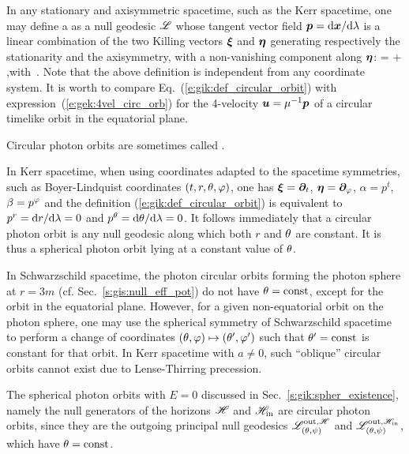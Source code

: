 In any stationary and axisymmetric spacetime, such as the Kerr spacetime, one may
define a 
as a null geodesic $\mathscr{L}$ whose tangent vector field $\bm{p}=\mathrm{d}\bm{x}/\mathrm{d}\lambda$ is a linear combination
of the two Killing vectors $\bm{\xi}$ and $\bm{\eta}$ generating respectively
the stationarity and the axisymmetry, with a non-vanishing component along $\bm{\eta}$:
\be \label{e:gik:def_circular_orbit}
     = \alpha \w{\xi} + \beta \w{\eta} ,\quad\mbox{with}\ \beta {}.
\ee
Note that the above definition is independent from any coordinate system.
It is worth to compare Eq.~(\ref{e:gik:def_circular_orbit}) with expression~(\ref{e:gek:4vel_circ_orb}) for the 4-velocity $\bm{u} = \mu^{-1}\bm{p}$ of a circular timelike orbit in the equatorial plane.

\begin{remark}
Circular photon orbits are sometimes called 
\cite{CunhaH18}.
\end{remark}

In Kerr spacetime, when using coordinates adapted to the spacetime symmetries,
such as Boyer-Lindquist coordinates $(t,r,\theta,\varphi)$, one has $\bm{\xi} = \bm{\partial}_t$,
$\bm{\eta}=\bm{\partial}_\varphi$, $\alpha=p^t$, $\beta=p^\varphi$ and the definition (\ref{e:gik:def_circular_orbit})
is equivalent to $p^r = \mathrm{d} r/\mathrm{d}\lambda = 0$ and $p^\theta = \mathrm{d}\theta/\mathrm{d}\lambda = 0$. It follows immediately
that a circular photon orbit is any null geodesic
along which both $r$ and $\theta$ are constant. It is thus a spherical photon orbit lying at a constant
value of $\theta$.

\begin{remark}
In Schwarzschild spacetime, the photon circular orbits forming the photon sphere
at $r=3m$ (cf. Sec.~\ref{s:gis:null_eff_pot}) do not have $\theta=\mathrm{const}$, except
for the orbit in the equatorial plane. However, for a given non-equatorial
orbit on the photon sphere, one may use the spherical symmetry of Schwarzschild spacetime
to perform a change of coordinates $(\theta,\varphi) \mapsto (\theta',\varphi')$ such that
$\theta' = \mathrm{const}$ is constant for that orbit.
In Kerr spacetime with $a\neq 0$, such
``oblique'' circular orbits cannot exist due to Lense-Thirring precession.
\end{remark}

\begin{example}
The spherical photon orbits with $E=0$ discussed in Sec.~\ref{s:gik:spher_existence},
namely the null generators of the horizons $\mathscr{H}$ and $\mathscr{H}_{\rm in}$ are
circular photon orbits, since they are the outgoing principal
null geodesics $\mathscr{L}^{{\rm out},\mathscr{H}}_{(\theta,\psi)}$ and $\mathscr{L}^{{\rm out},\mathscr{H}_{\rm in}}_{(\theta,\psi)}$, which have $\theta=\mathrm{const}$.
\end{example}

